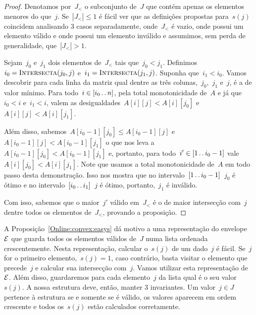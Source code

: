 \begin{proof}
Denotamos por~$J_<$ o subconjunto de~$J$ que contém apenas os elementos menores do que~$j$. Se~$| J_<| \leq 1$ é fácil ver que as definições propostas para~$s(j)$ coincidem analisando 3 casos separadamente, onde~$J_<$ é vazio, onde possui um elemento válido e onde possui um elemento inválido e assumimos, sem perda de generalidade, que~$|J_<| > 1$.

Sejam~$j_0$ e~$j_1$ dois elementos de~$J_<$ tais que~$j_0 < j_1$. Definimos~${i_0 = \textsc{Intersecta}(j_0,j)}$ e~${i_1 = \textsc{Intersecta}(j_1,j)}$. Suponha que~$i_1 < i_0$. Vamos descobrir para cada linha da matriz qual dentre as três colunas,~$j_0$,~$j_1$ e~$j$, é a de valor mínimo. Para todo~$i \in [i_0 \,.\,.\, n]$, pela total monotonicidade de~$A$ e já que~$i_0 < i$ e~$i_1 < i$, valem as desigualdades~$A[i][j] < A[i][j_0]$ e~$A[i][j] < A[i][j_1]$. 

Além disso, sabemos~$A[i_0-1][j_0] \leq A[i_0-1][j]$ e~$A[i_0-1][j] < A[i_0-1][j_1]$ o que nos leva a~$A[i_0-1][j_0] < A[i_0-1][j_1]$ e, portanto, para todo~$i' \in [1 \,.\,.\, i_0-1]$ vale~$A[i][j_0] < A[i][j_1]$. Note que usamos a total monotonicidade de~$A$ em todo passo desta demonstração. Isso nos mostra que no intervalo~$[1 \,.\,.\, i_0-1]$~$j_0$ é ótimo e no intervalo~$[i_0 \,.\,.\, i_1]$~$j$ é ótimo, portanto,~$j_1$ é inválido.

Com isso, sabemos que o maior~$j'$ válido em~$J_<$ é o de maior intersecção com~$j$ dentre todos os elementos de~$J_<$, provando a proposição.
\end{proof}

A Proposição~\ref{Online:convex:easys} dá motivo a uma representação do envelope~$\mathcal{E}$ que guarda todos os elementos válidos de~$J$ numa lista ordenada crescentemente. Nesta representação, calcular o~$s(j)$ de um dado~$j$ é fácil. Se~$j$ for o primeiro elemento,~$s(j) = 1$, caso contrário, basta visitar o elemento que precede~$j$ e calcular sua intersecção com~$j$. Vamos utilizar esta representação de~$\mathcal{E}$. Além disso, guardaremos para cada elemento~$j$ da lista qual é o seu valor~$s(j)$. A nossa estrutura deve, então, manter 3 invariantes. Um valor~$j \in J$ pertence à estrutura se e somente se é válido, os valores aparecem em ordem crescente e todos os~$s(j)$ estão calculados corretamente.

